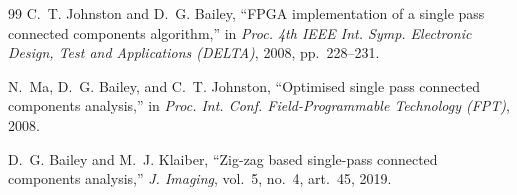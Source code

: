 \documentclass[conference]{IEEEtran}
\begin{document}
\begin{thebibliography}{99}
C.~T. Johnston and D.~G. Bailey, ``FPGA implementation of a single pass
connected components algorithm,'' in \emph{Proc. 4th IEEE Int. Symp.
Electronic Design, Test and Applications (DELTA)}, 2008, pp.~228--231.

N.~Ma, D.~G. Bailey, and C.~T. Johnston, ``Optimised single pass connected
components analysis,'' in \emph{Proc. Int. Conf. Field-Programmable
Technology (FPT)}, 2008.

D.~G. Bailey and M.~J. Klaiber, ``Zig-zag based single-pass connected
components analysis,'' \emph{J. Imaging}, vol.~5, no.~4, art.~45, 2019.
\end{thebibliography}
\end{document}
